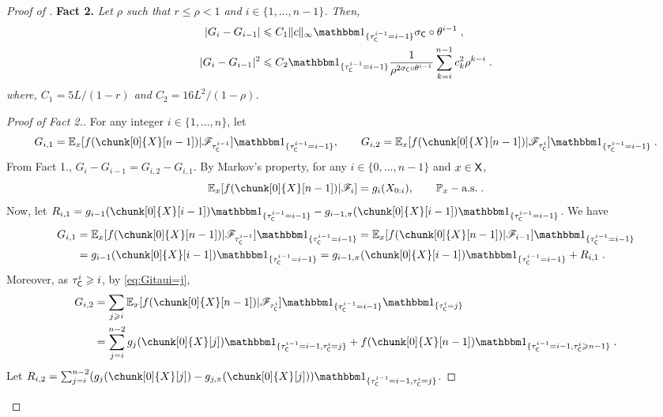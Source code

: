 \documentclass[leqno,11pt,a4paper]{article}
\begin{document}
\begin{proof}[Proof of ]
\noindent
{\bf Fact 2.} \emph{Let $\rho$ such that $r\leqslant \rho<1$ and $i\in\{1,\ldots,n-1\}$.
Then,}
\begin{align}
\label{eq:Gi-Gi-1} |G_i-G_{i-1}|&\leqslant C_1\|c\|_{\infty}\indiacc{\tau_{\cC}^{i-1}=i-1}\sigma_{\cC}\circ\theta^{i-1}\eqsp,\\
\label{eq:Gi-Gi-1Sq}  |G_i-G_{i-1}|^2&\leqslant C_2\indiacc{\tau_{\cC}^{i-1}=i-1}\frac1{\rho^{2\sigma_{\cC}\circ\theta^{i-1}}}\sum_{k=i}^{n-1}c_k^2\rho^{k-i}\eqsp.
\end{align}
\emph{where, $C_1=5L/(1-r)$ and $C_2=16L^2/(1-\rho)$.}
\begin{proof}[Proof of Fact 2.]
For any integer $i\in\{1,\ldots,n\}$, let
\[
G_{i,1}=\Ebb_x[f(\chunk[0]{X}[n-1])|\cF_{\tau_{\cC}^{i-1}}]\indiacc{\tau_{\cC}^{i-1}=i-1},\qquad G_{i,2}=\Ebb_x[f(\chunk[0]{X}[n-1])|\cF_{\tau_{\cC}^{i}}]\indiacc{\tau_{\cC}^{i-1}=i-1}\eqsp.
\]
From Fact 1., $G_i-G_{i-1}=G_{i,2}-G_{i,1}$.
By Markov's property, for any $i\in \{0,\ldots,n-1\}$ and  $x\in \mathsf{X}$,
\[
\Ebb_x[f(\chunk[0]{X}[n-1])|\cF_i]=g_i(X_{0:i}),\qquad \Pbb_{x}-\text{a.s.}\eqsp.
\]
Now, let $R_{i,1}=g_{i-1}(\chunk[0]{X}[i-1])\indiacc{\tau_{\cC}^{i-1}=i-1}-g_{i-1,\pi}(\chunk[0]{X}[i-1])\indiacc{\tau_{\cC}^{i-1}=i-1}$.
We have
\begin{align}
\notag G_{i,1}&=\Ebb_x[f(\chunk[0]{X}[n-1])|\cF_{\tau_{\cC}^{i-1}}]\indiacc{\tau_{\cC}^{i-1}=i-1}=\Ebb_x[f(\chunk[0]{X}[n-1])|\cF_{i-1}]\indiacc{\tau_{\cC}^{i-1}=i-1}\\
\label{eq:Gi1} &=g_{i-1}(\chunk[0]{X}[i-1])\indiacc{\tau_{\cC}^{i-1}=i-1}=g_{i-1,\pi}(\chunk[0]{X}[i-1])\indiacc{\tau_{\cC}^{i-1}=i-1}+R_{i,1}\eqsp.
\end{align}
Moreover, as $\tau_{\mathsf{C}}^i\geqslant i$, by \eqref{eq:Gitaui=j},
\begin{align}
\notag G_{i,2}&=\sum_{j\geqslant i}\Ebb_x[f(\chunk[0]{X}[n-1])|\cF_{\tau_{\cC}^{i}}]\indiacc{\tau_{\cC}^{i-1}=i-1}\indiacc{\tau_{\cC}^i=j}\\
\label{eq:Gi2} &=\sum_{j=i}^{n-2}g_j(\chunk[0]{X}[j])\indiacc{\tau_{\cC}^{i-1}=i-1,\tau_{\cC}^i=j}+f(\chunk[0]{X}[n-1])\indiacc{\tau_{\cC}^{i-1}=i-1,\tau_{\cC}^i\geqslant n-1}\eqsp.
\end{align}
Let $R_{i,2}=\sum_{j=i}^{n-2}(g_j(\chunk[0]{X}[j])-g_{j,\pi}(\chunk[0]{X}[j]))\indiacc{\tau_{\cC}^{i-1}=i-1,\tau_{\cC}^i=j}$.

\end{proof}
\end{proof}
\end{document}
